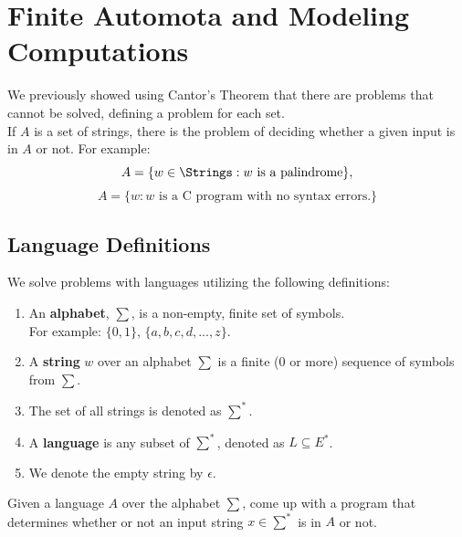 \documentclass{article}
\begin{document}
\section{Finite Automota and Modeling Computations}
We previously showed using Cantor's Theorem that there are problems that cannot be solved, defining a problem for each set.\\
If $A$ is a set of strings, there is the problem of deciding whether a given input is in $A$ or not. For example:
$$A = \{w \in \Strings: w \text{ is a palindrome} \},$$
$$A = \{w: w \text{ is a C program with no syntax errors.}\}$$

\subsection{Language Definitions}
We solve problems with languages utilizing the following definitions:
\begin{enumerate}
    \item An \textbf{alphabet}, $\sum$, is a non-empty, finite set of symbols.\\
    For example: $\{0,1\}$, $\{a,b,c,d,...,z\}$.
    \item A \textbf{string} $w$ over an alphabet $\sum$ is a finite (0 or more) sequence of symbols from $\sum$.
    \item The set of all strings is denoted as $\sum^*$.
    \item A \textbf{language} is any subset of $\sum^*$, denoted as $L \subseteq E^*$.
    \item We denote the empty string by $\epsilon$.
\end{enumerate}

Given a language $A$ over the alphabet $\sum$, come up with a program that determines whether or not an input string $x \in \sum^*$ is in $A$ or not.
\end{document}
